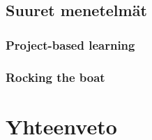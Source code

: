 \documentclass[finnish]{../tktltiki2}
\theoremstyle{definition}
\theoremstyle{remark}
\begin{document}
\subsection{Suuret menetelmät}

\subsubsection{Project-based learning}

\subsubsection{Rocking the boat}

\section{Yhteenveto}


%
%
% 
%



\end{document}
